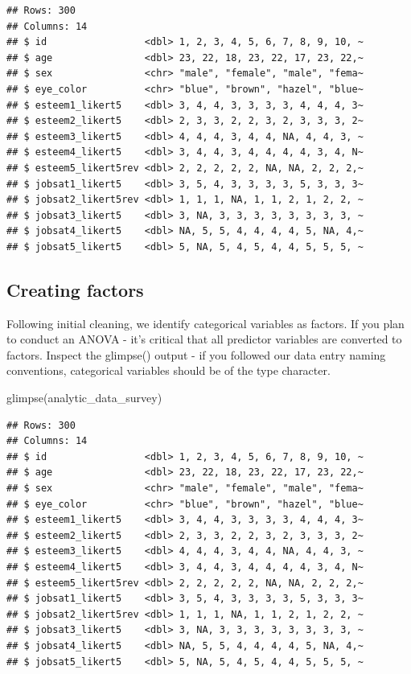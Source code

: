 \documentclass[
]{krantz}
\makeatletter
\newenvironment{Shaded}{\begin{snugshade}}{\end{snugshade}}
\newcommand{\FunctionTok}[1]{\textcolor[rgb]{0,0,0}{#1}}
\newcommand{\NormalTok}[1]{#1}
\newenvironment{kframe}{%
\medskip{}
\setlength{\fboxsep}{.8em}
 \def\at@end@of@kframe{}%
 \ifinner\ifhmode%
  \def\at@end@of@kframe{\end{minipage}}%
  \begin{minipage}{\columnwidth}%
 \fi\fi%
 \def\FrameCommand##1{\hskip\@totalleftmargin \hskip-\fboxsep
 \colorbox{shadecolor}{##1}\hskip-\fboxsep
     \hskip-\linewidth \hskip-\@totalleftmargin \hskip\columnwidth}%
 \MakeFramed {\advance\hsize-\width
   \@totalleftmargin\z@ \linewidth\hsize
   \@setminipage}}%
 {\par\unskip\endMakeFramed%
 \at@end@of@kframe}
\renewenvironment{Shaded}{\begin{kframe}}{\end{kframe}}
\makeatother
\begin{document}
\begin{verbatim}
## Rows: 300
## Columns: 14
## $ id                 <dbl> 1, 2, 3, 4, 5, 6, 7, 8, 9, 10, ~
## $ age                <dbl> 23, 22, 18, 23, 22, 17, 23, 22,~
## $ sex                <chr> "male", "female", "male", "fema~
## $ eye_color          <chr> "blue", "brown", "hazel", "blue~
## $ esteem1_likert5    <dbl> 3, 4, 4, 3, 3, 3, 3, 4, 4, 4, 3~
## $ esteem2_likert5    <dbl> 2, 3, 3, 2, 2, 3, 2, 3, 3, 3, 2~
## $ esteem3_likert5    <dbl> 4, 4, 4, 3, 4, 4, NA, 4, 4, 3, ~
## $ esteem4_likert5    <dbl> 3, 4, 4, 3, 4, 4, 4, 4, 3, 4, N~
## $ esteem5_likert5rev <dbl> 2, 2, 2, 2, 2, NA, NA, 2, 2, 2,~
## $ jobsat1_likert5    <dbl> 3, 5, 4, 3, 3, 3, 3, 5, 3, 3, 3~
## $ jobsat2_likert5rev <dbl> 1, 1, 1, NA, 1, 1, 2, 1, 2, 2, ~
## $ jobsat3_likert5    <dbl> 3, NA, 3, 3, 3, 3, 3, 3, 3, 3, ~
## $ jobsat4_likert5    <dbl> NA, 5, 5, 4, 4, 4, 4, 5, NA, 4,~
## $ jobsat5_likert5    <dbl> 5, NA, 5, 4, 5, 4, 4, 5, 5, 5, ~
\end{verbatim}

\hypertarget{creating-factors-3}{%
\subsection{Creating factors}\label{creating-factors-3}}

Following initial cleaning, we identify categorical variables as factors. If you plan to conduct an ANOVA - it's critical that all predictor variables are converted to factors. Inspect the glimpse() output - if you followed our data entry naming conventions, categorical variables should be of the type character.

\begin{Shaded}
\begin{Highlighting}[]
\FunctionTok{glimpse}\NormalTok{(analytic\_data\_survey)}
\end{Highlighting}
\end{Shaded}

\begin{verbatim}
## Rows: 300
## Columns: 14
## $ id                 <dbl> 1, 2, 3, 4, 5, 6, 7, 8, 9, 10, ~
## $ age                <dbl> 23, 22, 18, 23, 22, 17, 23, 22,~
## $ sex                <chr> "male", "female", "male", "fema~
## $ eye_color          <chr> "blue", "brown", "hazel", "blue~
## $ esteem1_likert5    <dbl> 3, 4, 4, 3, 3, 3, 3, 4, 4, 4, 3~
## $ esteem2_likert5    <dbl> 2, 3, 3, 2, 2, 3, 2, 3, 3, 3, 2~
## $ esteem3_likert5    <dbl> 4, 4, 4, 3, 4, 4, NA, 4, 4, 3, ~
## $ esteem4_likert5    <dbl> 3, 4, 4, 3, 4, 4, 4, 4, 3, 4, N~
## $ esteem5_likert5rev <dbl> 2, 2, 2, 2, 2, NA, NA, 2, 2, 2,~
## $ jobsat1_likert5    <dbl> 3, 5, 4, 3, 3, 3, 3, 5, 3, 3, 3~
## $ jobsat2_likert5rev <dbl> 1, 1, 1, NA, 1, 1, 2, 1, 2, 2, ~
## $ jobsat3_likert5    <dbl> 3, NA, 3, 3, 3, 3, 3, 3, 3, 3, ~
## $ jobsat4_likert5    <dbl> NA, 5, 5, 4, 4, 4, 4, 5, NA, 4,~
## $ jobsat5_likert5    <dbl> 5, NA, 5, 4, 5, 4, 4, 5, 5, 5, ~
\end{verbatim}
\end{document}

